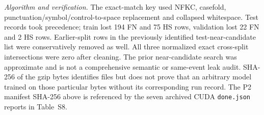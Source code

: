 \begin{table}[p]
\par\smallskip
\begin{minipage}{0.96\linewidth}\scriptsize
\emph{Algorithm and verification.} The exact-match key used NFKC,
casefold, punctuation/symbol/control-to-space replacement and collapsed
whitespace. Test records took precedence; train lost 194 FN and 75 HS
rows, validation lost 22 FN and 2 HS rows. Earlier-split rows in the
previously identified test-near-candidate list were conservatively
removed as well. All three normalized exact cross-split intersections
were zero after cleaning. The prior near-candidate search was approximate
and is not a comprehensive semantic or same-event leak audit. SHA-256
of the gzip bytes identifies files but does not prove that an arbitrary
model trained on those particular bytes without its corresponding run
record. The P2 manifest SHA-256 above is referenced by the seven
archived CUDA \texttt{done.json} reports in Table~S8.
\end{minipage}
\end{table}
